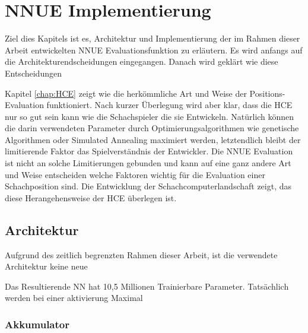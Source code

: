 \chapter{NNUE Implementierung}

Ziel dies Kapitels ist es, Architektur und Implementierung der im Rahmen dieser Arbeit entwickelten \ac{NNUE} Evaluationsfunktion zu erläutern. Es wird anfangs auf die Architekturendscheidungen eingegangen. Danach wird geklärt wie diese Entscheidungen

Kapitel \autoref{chap:HCE} zeigt wie die herkömmliche Art und Weise der Positions-Evaluation funktioniert. Nach kurzer Überlegung wird aber klar, dass die \ac{HCE} nur so gut sein kann wie die Schachspieler die sie Entwickeln. Natürlich können die darin verwendeten Parameter durch Optimierungsalgorithmen wie genetische Algorithmen oder Simulated Annealing maximiert werden, letztendlich bleibt der limitierende Faktor das Spielverständnis der Entwickler. Die \ac{NNUE} Evaluation ist nicht an solche Limitierungen gebunden und kann auf eine ganz andere Art und Weise entscheiden welche Faktoren wichtig für die Evaluation einer Schachposition sind. Die Entwicklung der Schachcomputerlandschaft zeigt, das diese Herangehensweise der \ac{HCE} überlegen ist.


\section{Architektur}


Aufgrund des zeitlich begrenzten Rahmen dieser Arbeit, ist die verwendete Architektur keine neue

Das Resultierende \ac{NN} hat 10,5 Millionen Trainierbare Parameter. Tatsächlich werden bei einer aktivierung Maximal


\subsection{Akkumulator}



